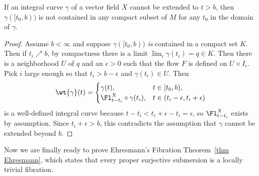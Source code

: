 \begin{lem}\label{lem escape}
    If an integral curve $\gamma$ of a vector field $X$ cannot be extended to $t>b$, then $\gamma([t_0,b))$ is not contained in any compact subset of $M$ for any $t_0$ in the domain of $\gamma$.
\end{lem}
\begin{proof}
    Assume $b<\infty$ and suppose $\gamma([t_0,b))$ \emph{is} contained in a compact set $K$. Then if $t_i\nearrow b$, by compactness there is a limit $\lim_i\gamma(t_i)=q\in K$. Then there is a neighborhood $U$ of $q$ and an $\epsilon>0$ such that the flow $F$ is defined on $U\times I_\epsilon$. Pick $i$ large enough so that $t_i>b-\epsilon$ and $\gamma(t_i)\in U$. Then 
    \[
        \wt{\gamma}(t)=
        \begin{cases} 
            \gamma(t), & t\in[t_0,b),\\ 
            \Fl^X_{t-t_i}\circ \gamma(t_i), & t\in (t_i-\epsilon,t_i+\epsilon)   
        \end{cases}
    \]
    is a well-defined integral curve because $t-t_i<t_i+\epsilon-t_i=\epsilon$, so $\Fl^X_{t-t_i}$ exists by assumption. Since $t_i+\epsilon>b$, this contradicts the assumption that $\gamma $ cannot be extended beyond $b$.
\end{proof}


Now we are finally ready to prove Ehresmann's Fibration Theorem~\ref{thm Ehresmann}, which states that every proper surjective submersion is a locally trivial fibration.

